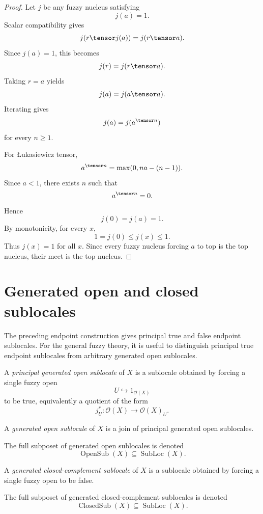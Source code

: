 \begin{proof}
Let \(j\) be any fuzzy nucleus satisfying
\[
    j(a)=1.
\]
Scalar compatibility gives
\[
    j(r\tensor j(a))=j(r\tensor a).
\]
Since \(j(a)=1\), this becomes
\[
    j(r)=j(r\tensor a).
\]
Taking \(r=a\) yields
\[
    j(a)=j(a\tensor a).
\]
Iterating gives
\[
    j(a)=j(a^{\tensor n})
\]
for every \(n\geq1\).

For Łukasiewicz tensor,
\[
    a^{\tensor n}=\max(0,na-(n-1)).
\]
Since \(a<1\), there exists \(n\) such that
\[
    a^{\tensor n}=0.
\]
Hence
\[
    j(0)=j(a)=1.
\]
By monotonicity, for every \(x\),
\[
    1=j(0)\leq j(x)\leq 1.
\]
Thus \(j(x)=1\) for all \(x\).  Since every fuzzy nucleus forcing \(a\) to top
is the top nucleus, their meet is the top nucleus.
\end{proof}

\section{Generated open and closed sublocales}
\label{sec:generated-open-closed-sublocales-corrected}

The preceding endpoint construction gives principal true and false endpoint
sublocales.  For the general fuzzy theory, it is useful to distinguish
principal true endpoint sublocales from arbitrary generated open sublocales.

\begin{definition}
\label{def:principal-generated-open-sublocale}
A \emph{principal generated open sublocale} of \(X\) is a sublocale obtained by
forcing a single fuzzy open
\[
    U\hookrightarrow1_{\mathcal O(X)}
\]
to be true, equivalently a quotient of the form
\[
    j_U^\ast:\mathcal O(X)\to\mathcal O(X)_U.
\]
\end{definition}

\begin{definition}
\label{def:generated-open-sublocale}
A \emph{generated open sublocale} of \(X\) is a join of principal generated
open sublocales.

The full subposet of generated open sublocales is denoted
\[
    \operatorname{OpenSub}(X)\subseteq\operatorname{SubLoc}(X).
\]
\end{definition}

\begin{definition}
\label{def:generated-closed-complement-sublocale}
A \emph{generated closed-complement sublocale} of \(X\) is a sublocale obtained
by forcing a single fuzzy open to be false.

The full subposet of generated closed-complement sublocales is denoted
\[
    \operatorname{ClosedSub}(X)\subseteq\operatorname{SubLoc}(X).
\]
\end{definition}


